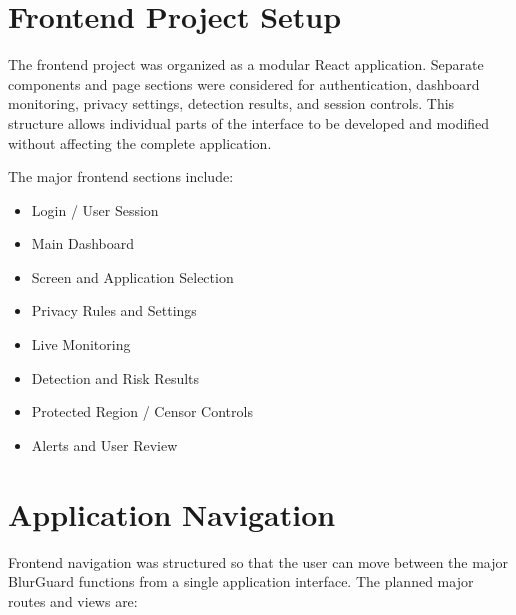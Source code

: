 \documentclass[12pt,a4paper]{article}
\begin{document}

\section{Frontend Project Setup}

The frontend project was organized as a modular React application. Separate components
and page sections were considered for authentication, dashboard monitoring, privacy settings,
detection results, and session controls. This structure allows individual parts of the
interface to be developed and modified without affecting the complete application.

The major frontend sections include:

\begin{itemize}

    \item Login / User Session

    \item Main Dashboard

    \item Screen and Application Selection

    \item Privacy Rules and Settings

    \item Live Monitoring

    \item Detection and Risk Results

    \item Protected Region / Censor Controls

    \item Alerts and User Review

\end{itemize}


\section{Application Navigation}

Frontend navigation was structured so that the user can move between the major BlurGuard
functions from a single application interface. The planned major routes and views are:
\end{document}
